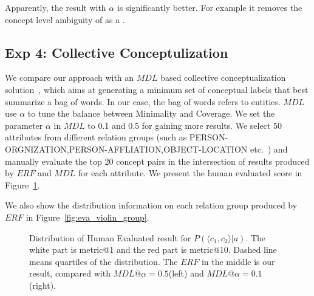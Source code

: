 %
%

Apparently, the result with $\alpha$ is significantly better. For example it removes the concept level ambiguity of  as a .


\subsection{Exp 4: Collective Conceptulization}
We compare our approach with an $MDL$ based collective conceptualization solution~\cite{sunconceptual}, which aims at generating a minimum set of conceptual labels that best summarize a bag of words.
In our case, the bag of words refers to entities.
$MDL$ use $\alpha$ to tune the balance between \ac{Minimality} and \ac{Coverage}. We set the parameter $\alpha$ in $MDL$ to 0.1 and 0.5 for gaining more results.
We select 50 attributes from different relation groups (such as \ac{PERSON-ORGNIZATION,PERSON-AFFLIATION,OBJECT-LOCATION} etc.\ ) and manually evaluate the top 20 concept pairs in the intersection of results produced by $ERF$ and $MDL$ for each attribute.
We present the human evaluated score in Figure~\ref{fig:eva_violin_pc1c2ga}.

We also show the distribution information on each relation group produced by $ERF$ in Figure~\ref{fig:eva_violin_group}.

\begin{figure}[!htb]
\centering
{}
\caption{Distribution of Human Evaluated result for $P(\langle c_1,c_2 \rangle|a)$. \small The white part is metric@1 and the red part is metric@10. Dashed line means quartiles of the distribution. The $ERF$ in the middle is our result, compared with $MDL@\alpha=0.5$(left) and $MDL@\alpha=0.1$(right). }
\label{fig:eva_violin_pc1c2ga}
\end{figure}

